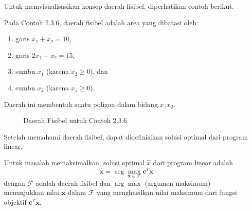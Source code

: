 Untuk memvisualisasikan konsep daerah fisibel, diperhatikan contoh berikut.
\begin{contoh}
    Pada Contoh 2.3.6, daerah fisibel adalah area yang dibatasi oleh:
    \begin{enumerate}
    \item garis $x_1 + x_2 = 10$,
        \item garis $2x_1 + x_2 = 15$,
        \item sumbu $x_1$ (karena $x_2 \geq 0$), dan
        \item sumbu $x_2$ (karena $x_1 \geq 0$).
    \end{enumerate}
    Daerah ini membentuk suatu poligon dalam bidang $x_1x_2$.
    
    \begin{figure}[H]
        \centering
        \caption{Daerah Fisibel untuk Contoh 2.3.6}
        \label{fig:feasible_region}
    \end{figure}
\end{contoh}

Setelah memahami daerah fisibel, dapat didefinisikan solusi optimal dari program linear.
\begin{definisi}
    Untuk masalah memaksimalkan, solusi optimal $\hat{x}$ dari program linear adalah
    $$\boldsymbol{\hat{x}} = \arg\max_{\boldsymbol{x} \in \mathcal{F}} \boldsymbol{c}^T \boldsymbol{x}$$
    dengan $\mathcal{F}$ adalah daerah fisibel dan $\arg\max$ (argumen maksimum) menunjukkan nilai $\boldsymbol{x}$ dalam $\mathcal{F}$ yang menghasilkan nilai maksimum dari fungsi objektif $\boldsymbol{c}^T \boldsymbol{x}$.
\end{definisi}

